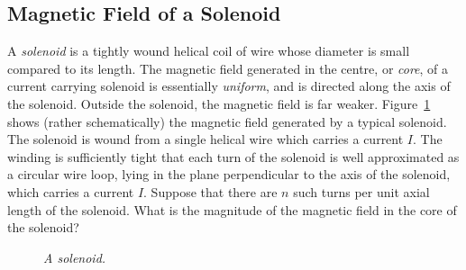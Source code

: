 \subsection{Magnetic Field of a Solenoid}\label{s8.8}
A {\em solenoid}\/ is a tightly wound  helical coil of wire whose diameter is small compared
to its length. The magnetic field generated in the centre, or {\em core}, 
of  a current carrying solenoid
is essentially {\em uniform}, and is directed along the axis of the solenoid.
Outside the solenoid, the magnetic field is far weaker. Figure~\ref{f8.8} shows
(rather schematically) the magnetic field generated by a typical solenoid. 
The solenoid is wound from a single helical wire which carries a current $I$. 
The winding is sufficiently tight that each turn of the solenoid is well
approximated as 
a circular wire loop, lying in the plane perpendicular to the axis of
the solenoid, which carries a current $I$. Suppose that there
are $n$ such turns per unit axial length of the solenoid. What is the
magnitude of the magnetic field in the core of the solenoid?

\begin{figure}[h]
\epsfysize=3in
\centerline{}
\caption{\em A solenoid.}\label{f8.8}
\end{figure}

